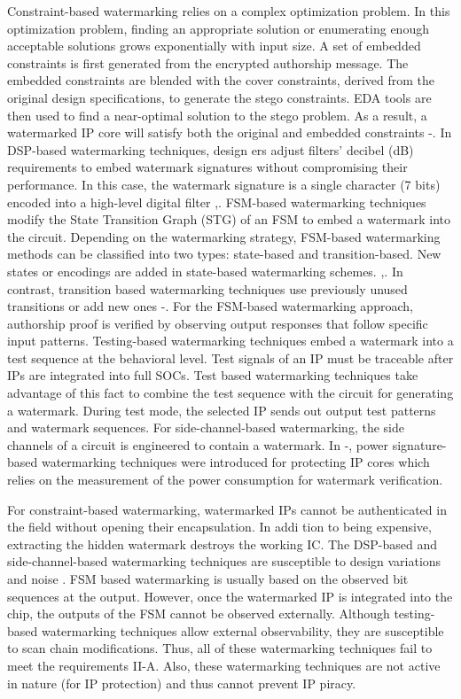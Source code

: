 \documentclass[onecolumn]{IEEEtran}
\begin{document}
Constraint-based watermarking relies on a complex optimization
problem. In this optimization problem, finding an appropriate solution
or enumerating enough acceptable solutions grows exponentially with
input size. A set of embedded constraints is first generated from
the encrypted authorship message. The embedded constraints are
blended with the cover constraints, derived from the original design
specifications, to generate the stego constraints. EDA tools are then
used to find a near-optimal solution to the stego problem. As a result,
a watermarked IP core will satisfy both the original and embedded
constraints \cite{Tehranipoor2011}-\cite{Hong1998}. In DSP-based watermarking techniques, design
ers adjust filters’ decibel (dB) requirements to embed watermark
signatures without compromising their performance. In this case, the
watermark signature is a single character (7 bits) encoded into a
high-level digital filter \cite{Chapman2000},\cite{Rashid1999}. FSM-based watermarking techniques
modify the State Transition Graph (STG) of an FSM to embed a
watermark into the circuit. Depending on the watermarking strategy,
FSM-based watermarking methods can be classified into two types:
state-based and transition-based. New states or encodings are added
in state-based watermarking schemes. \cite{Oliveira2001},\cite{Lewandowski2012}. In contrast, transition
based watermarking techniques use previously unused transitions or
add new ones \cite{Torunoglu2000}-\cite{Cui2011}. For the FSM-based watermarking approach,
authorship proof is verified by observing output responses that follow
specific input patterns. Testing-based watermarking techniques embed
a watermark into a test sequence at the behavioral level. Test signals
of an IP must be traceable after IPs are integrated into full SOCs. Test
based watermarking techniques \cite{Cui2015} take advantage of this fact to
combine the test sequence with the circuit for generating a watermark.
During test mode, the selected IP sends out output test patterns and
watermark sequences. For side-channel-based watermarking, the side
channels of a circuit is engineered to contain a watermark. In \cite{Ziener2006}-\cite{Marchand2014},
power signature-based watermarking techniques were introduced for
protecting IP cores which relies on the measurement of the power
consumption for watermark verification.

For constraint-based watermarking, watermarked IPs cannot be
authenticated in the field without opening their encapsulation. In addi
tion to being expensive, extracting the hidden watermark destroys the
working IC. The DSP-based and side-channel-based watermarking
techniques are susceptible to design variations and noise \cite{Anandakumar2022}. FSM
based watermarking is usually based on the observed bit sequences at
the output. However, once the watermarked IP is integrated into the
chip, the outputs of the FSM cannot be observed externally. Although
testing-based watermarking techniques allow external observability,
they are susceptible to scan chain modifications. Thus, all of these
watermarking techniques fail to meet the requirements II-A. Also,
these watermarking techniques are not active in nature (for IP
protection) and thus cannot prevent IP piracy.
\end{document}
